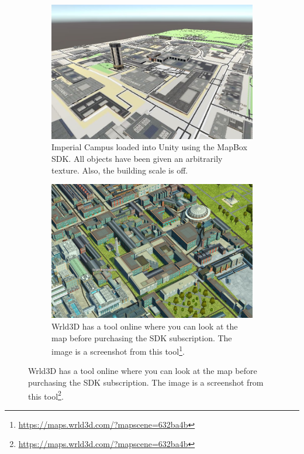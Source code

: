 \begin{figure}[!htbp] 
\centering
\begin{minipage}[t]{.45\textwidth}
\centering
\begin{subfigure}{\textwidth}
        \includegraphics[width=\linewidth, left]{06_Implementation/00_Maps/Images/MapBox1Cropped.JPG}
        \caption[Map created using MapBox]{Imperial Campus loaded into Unity using the MapBox SDK. All objects have been given an arbitrarily texture. Also, the building scale is off.}
        \label{maps:figure:MapBox}
    \end{subfigure}
\end{minipage}
\qquad
\begin{minipage}[t]{.45\textwidth}
    \centering
    \begin{subfigure}{\textwidth}
        \includegraphics[width=\linewidth, right]{06_Implementation/00_Maps/Images/Wrld3D1Cropped.JPG}
        \caption[Map created using Wrld3D]{Wrld3D has a tool online where you can look at the map before purchasing the SDK subscription. The image is a screenshot from this tool\footnote{\url{https://maps.wrld3d.com/?mapscene=632ba4b}}.}
        \label{maps:figure:Wrld3D}
    \end{subfigure}
\end{minipage}
\end{figure}

